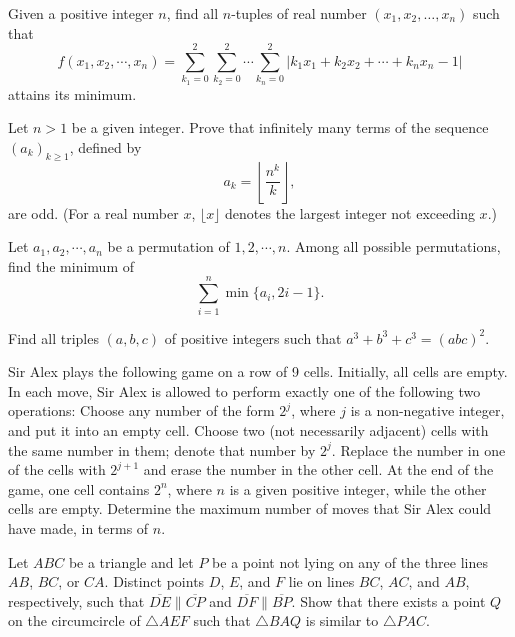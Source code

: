 \documentclass[11pt]{scrartcl}
\begin{document}
\begin{problem}[7019189714774437758]
Given a positive integer $n$, find all $n$-tuples of real number $(x_1,x_2,\ldots,x_n)$ such that
\[ f(x_1,x_2,\cdots,x_n)=\sum_{k_1=0}^{2} \sum_{k_2=0}^{2} \cdots \sum_{k_n=0}^{2} \big| k_1x_1+k_2x_2+\cdots+k_nx_n-1 \big| \]attains its minimum.
\end{problem}
\begin{problem}[7021355208717803796]
Let $n > 1$ be a given integer. Prove that infinitely many terms of the sequence $(a_k )_{k\ge 1}$, defined by\[a_k=\left\lfloor\frac{n^k}{k}\right\rfloor,\]are odd. (For a real number $x$, $\lfloor x\rfloor$ denotes the largest integer not exceeding $x$.)
\end{problem}
\begin{problem}[7071673173476608586]
Let $a_1,a_2,\cdots,a_n$ be a permutation of $1,2,\cdots,n$. Among all possible permutations, find the minimum of$$\sum_{i=1}^n \min \{ a_i,2i-1 \}.$$
\end{problem}
\begin{problem}[7088779505939683183]
Find all triples $(a, b, c)$ of positive integers such that $a^3 + b^3 + c^3 = (abc)^2$.
\end{problem}
\begin{problem}[7146141883280672441]
	Sir Alex plays the following game on a row of 9 cells. Initially, all cells are empty. In each move, Sir Alex is allowed to perform exactly one of the following two operations:
Choose any number of the form $2^j$, where $j$ is a non-negative integer, and put it into an empty cell.
Choose two (not necessarily adjacent) cells with the same number in them; denote that number by $2^j$. Replace the number in one of the cells with $2^{j+1}$ and erase the number in the other cell.
At the end of the game, one cell contains $2^n$, where $n$ is a given positive integer, while the other cells are empty. Determine the maximum number of moves that Sir Alex could have made, in terms of $n$.
\end{problem}
\begin{problem}[7203789790519658258]
Let $ABC$ be a triangle and let $P$ be a point not lying on any of the three lines $AB$, $BC$, or $CA$. Distinct points $D$, $E$, and $F$ lie on lines $BC$, $AC$, and $AB$, respectively, such that $\overline{DE}\parallel \overline{CP}$ and $\overline{DF}\parallel \overline{BP}$. Show that there exists a point $Q$ on the circumcircle of $\triangle AEF$ such that $\triangle BAQ$ is similar to $\triangle PAC$.
\end{problem}
\end{document}
